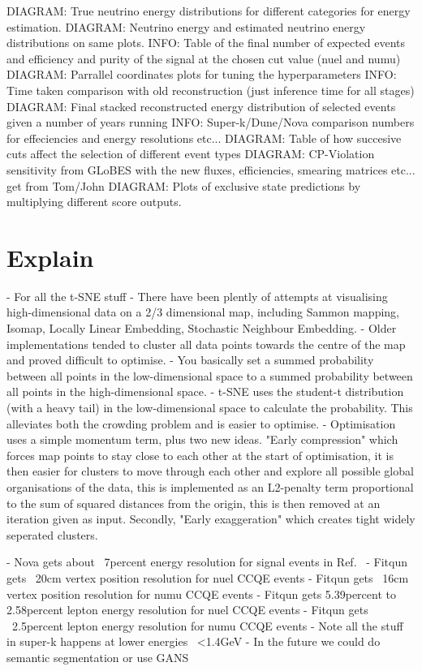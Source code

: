 DIAGRAM: True neutrino energy distributions for different categories for energy estimation.
DIAGRAM: Neutrino energy and estimated neutrino energy distributions on same plots.
INFO: Table of the final number of expected events and efficiency and purity of the signal at the chosen cut value (nuel and numu)
DIAGRAM: Parrallel coordinates plots for tuning the hyperparameters
INFO: Time taken comparison with old reconstruction (just inference time for all stages)
DIAGRAM: Final stacked reconstructed energy distribution of selected events given a number of years running
INFO: Super-k/Dune/Nova comparison numbers for effeciencies and energy resolutions etc...
DIAGRAM: Table of how succesive cuts affect the selection of different event types
DIAGRAM: CP-Violation sensitivity from GLoBES with the new fluxes, efficiencies, smearing matrices etc... get from Tom/John
DIAGRAM: Plots of exclusive state predictions by multiplying different score outputs.


\section{Explain}
- For all the t-SNE stuff
- There have been plently of attempts at visualising high-dimensional data on a 2/3 dimensional map, including Sammon mapping, Isomap, Locally Linear Embedding, Stochastic Neighbour Embedding.
- Older implementations tended to cluster all data points towards the centre of the map and proved difficult to optimise.
- You basically set a summed probability between all points in the low-dimensional space to a summed probability between all points in the high-dimensional space.
- t-SNE uses the student-t distribution (with a heavy tail) in the low-dimensional space to calculate the probability. This alleviates both the crowding problem and is easier to optimise.
- Optimisation uses a simple momentum term, plus two new ideas. "Early compression" which forces map points to stay close to each other at the start of optimisation, it is then easier for clusters to move through each other and explore all possible global organisations of the data, this is implemented as an L2-penalty term proportional to the sum of squared distances from the origin, this is then removed at an iteration given as input. Secondly, "Early exaggeration" which creates tight widely seperated clusters.


- Nova gets about ~7percent energy resolution for signal events
in Ref.~\cite{jiang2019}
- Fitqun gets ~20cm vertex position resolution for nuel CCQE events
- Fitqun gets ~16cm vertex position resolution for numu CCQE events
- Fitqun gets 5.39percent to 2.58percent lepton energy resolution for nuel CCQE events
- Fitqun gets ~2.5percent lepton energy resolution for numu CCQE events
- Note all the stuff in super-k happens at lower energies ~<1.4GeV
- In the future we could do semantic segmentation or use GANS


